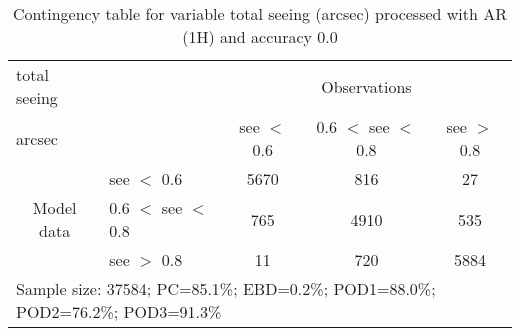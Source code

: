 \begin{table}[]
\begin{center}
\begin{tabular}{llccc}
\hline
{total seeing}                                       &                                                    & \multicolumn{3}{c}{Observations}                 \\
{arcsec}                                       &                             & see $<$ 0.6   & 0.6 $<$ see $<$ 0.8 & see $>$ 0.8 \\
\hline
\multicolumn{1}{c}{\multirow{3}{*}{Model data}}  & see $<$ 0.6             & 5670                & 816                       & 27              \\
                                                 & 0.6  $<$ see $<$ 0.8 & 765                & 4910                       & 535              \\
                                                 & see $>$ 0.8             & 11                & 720                       & 5884              \\
\hline
\multicolumn{5}{l}{Sample size: 37584; PC=85.1\%; EBD=0.2\%; POD1=88.0\%; POD2=76.2\%; POD3=91.3\%}
\end{tabular}
\end{center}
\caption{Contingency table for variable total seeing (arcsec) processed with AR (1H) and accuracy 0.0}
\label{tab:contingencyseeAFT}
\end{table}
